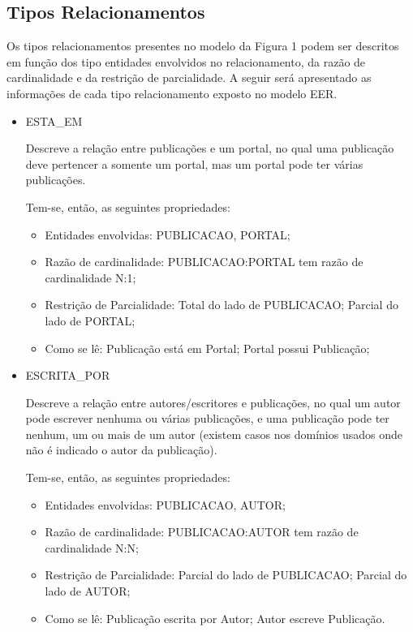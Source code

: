\subsection{Tipos Relacionamentos}

Os tipos relacionamentos presentes no modelo da Figura 1 podem ser descritos em função dos tipo entidades envolvidos no relacionamento, da razão de cardinalidade e da restrição de parcialidade. A seguir será apresentado as informações de cada tipo relacionamento exposto no modelo EER.

\begin{itemize}
				
\item ESTA\_EM

Descreve a relação entre publicações e um portal, no qual uma publicação deve pertencer a somente um portal, mas um portal pode ter várias publicações.

Tem-se, então, as seguintes propriedades:

\begin{itemize}

\item Entidades envolvidas: PUBLICACAO, PORTAL;
\item Razão de cardinalidade: PUBLICACAO:PORTAL tem razão de cardinalidade N:1;
\item Restrição de Parcialidade: Total do lado de PUBLICACAO; Parcial do lado de PORTAL;
\item Como se lê: Publicação está em Portal; Portal possui Publicação;
\end{itemize}
\end{itemize}

\begin{itemize}

				\item ESCRITA\_POR

Descreve a relação entre autores/escritores e publicações, no qual um autor pode escrever nenhuma ou várias publicações, e uma publicação pode ter nenhum, um ou mais de um autor (existem casos nos domínios usados onde não é indicado o autor da publicação).

Tem-se, então, as seguintes propriedades:

\begin{itemize}

				\item Entidades envolvidas: PUBLICACAO, AUTOR;
				\item Razão de cardinalidade: PUBLICACAO:AUTOR tem razão de cardinalidade N:N;
				\item Restrição de Parcialidade: Parcial do lado de PUBLICACAO; Parcial do lado de AUTOR;
				\item Como se lê: Publicação escrita por Autor; Autor escreve Publicação.
\end{itemize}
\end{itemize}

